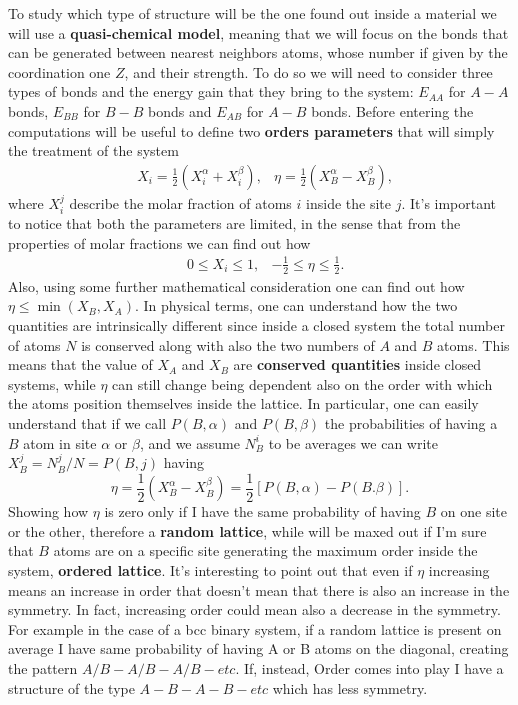 To study which type of structure will be the one found out inside a material we will use a \textbf{quasi-chemical model}, meaning that we will focus on the bonds that can be generated between nearest neighbors atoms, whose number if given by the coordination one $Z$, and their strength. To do so we will need to consider three types of bonds and the energy gain that they bring to the system: $E_{AA}$ for $A-A$ bonds, $E_{BB}$ for $B-B$ bonds and $E_{AB}$ for $A-B$ bonds. Before entering the computations will be useful to define two \textbf{orders parameters} that will simply the treatment of the system
\begin{align}
    \label{eq:orderParameters}
    &X_i = \frac{1}{2}\left( X_i^\alpha + X_i^\beta \right), &\eta = \frac{1}{2}\left( X_B^\alpha - X_B^\beta \right),
\end{align}
where $X_i^j$ describe the molar fraction of atoms $i$ inside the site $j$. It's important to notice that both the parameters are limited, in the sense that from the properties of molar fractions we can find out how
\begin{align}
    &0 \le X_i \le 1, &-\frac{1}{2} \le \eta \le \frac{1}{2}.
\end{align}
Also, using some further mathematical consideration one can find out how $\eta \le \min(X_B, X_A)$. In physical terms, one can understand how the two quantities are intrinsically different since inside a closed system the total number of atoms $N$ is conserved along with also the two numbers of $A$ and $B$ atoms. This means that the value of $X_A$ and $X_B$ are \textbf{conserved quantities} inside closed systems, while $\eta$ can still change being dependent also on the order with which the atoms position themselves inside the lattice. In particular, one can easily understand that if we call $P(B, \alpha)$ and $P(B, \beta)$ the probabilities of having a $B$ atom in site $\alpha$ or $\beta$, and we assume $N_{B}^i$ to be averages we can write $X_B^j = N_B^j/N = P(B, j)$ having
\begin{equation}
    \eta = \frac{1}{2}\left( X_B^\alpha - X_B^\beta \right) = \frac{1}{2}\left[ P(B, \alpha) - P(B. \beta) \right].
\end{equation}
Showing how $\eta$ is zero only if I have the same probability of having $B$ on one site or the other, therefore a \textbf{random lattice}, while will be maxed out if I'm sure that $B$ atoms are on a specific site generating the maximum order inside the system, \textbf{ordered lattice}.
\nt
{
    It's interesting to point out that even if $\eta$ increasing means an increase in order that doesn't mean that there is also an increase in the symmetry. In fact, increasing order could mean also a decrease in the symmetry. For example in the case of a bcc binary system, if a random lattice is present on average I have same probability of having A or B atoms on the diagonal, creating the pattern $A/B-A/B-A/B-etc$. If, instead, Order comes into play I have a structure of the type $A-B-A-B-etc$ which has less symmetry.
}

